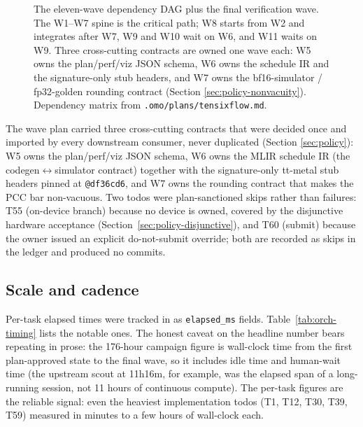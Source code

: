 \begin{figure}[t]
{}%
  \caption{The eleven-wave dependency DAG plus the final verification wave.
    The W1--W7 spine is the critical path; W8 starts from W2 and integrates
    after W7, W9 and W10 wait on W6, and W11 waits on W9. Three cross-cutting
    contracts are owned one wave each: W5 owns the plan/perf/viz JSON schema,
    W6 owns the schedule IR and the signature-only stub headers, and W7 owns
    the     bf16-simulator / fp32-golden rounding contract (Section
    \ref{sec:policy-nonvacuity}). Dependency matrix from
    \texttt{.omo/plans/tensixflow.md}.}
  \label{fig:orch-wave-dag}
\end{figure}

The wave plan carried three cross-cutting contracts that were decided once and
imported by every downstream consumer, never duplicated (Section
\ref{sec:policy}): W5 owns the plan/perf/viz JSON schema, W6 owns the MLIR
schedule IR (the codegen$\leftrightarrow$simulator contract) together with the
signature-only tt-metal stub headers pinned at \texttt{@df36cd6}, and W7 owns
the rounding contract that makes the PCC bar non-vacuous. Two todos were
plan-sanctioned skips rather than failures: T55 (on-device branch) because no
device is owned, covered by the disjunctive hardware acceptance
(Section~\ref{sec:policy-disjunctive}), and T60 (submit) because the owner
issued an explicit do-not-submit override; both are recorded as skips in the
ledger and produced no commits.

\subsection{Scale and cadence}

Per-task elapsed times were tracked in  as
\texttt{elapsed\_ms} fields. Table~\ref{tab:orch-timing} lists the notable
ones. The honest caveat on the headline number bears repeating in prose: the
176-hour campaign figure is wall-clock time from the first plan-approved state
to the final wave, so it includes idle time and human-wait time (the upstream
scout at 11h16m, for example, was the elapsed span of a long-running session,
not 11 hours of continuous compute). The per-task figures are the reliable
signal: even the heaviest implementation todos (T1, T12, T30, T39, T59)
measured in minutes to a few hours of wall-clock each.

